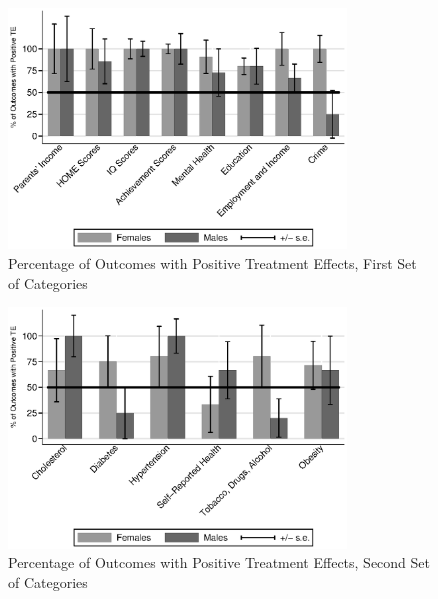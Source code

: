 \documentclass[static]{JJH-Beamer}
\begin{document}
\begin{frame}

\begin{figure}[H]
\caption{Percentage of Outcomes with Positive Treatment Effects, First Set of Categories}
\begin{center}
\includegraphics[width=0.8\textwidth]{output/itt_noctrl_cats1}
\end{center}
\end{figure}

\end{frame}

\begin{frame}

\begin{figure}[H]
\caption{Percentage of Outcomes with Positive Treatment Effects, Second Set of Categories}
\begin{center}
\includegraphics[width=0.8\textwidth]{output/itt_noctrl_cats2}
\end{center}
\end{figure}

\end{frame}
\end{document}
